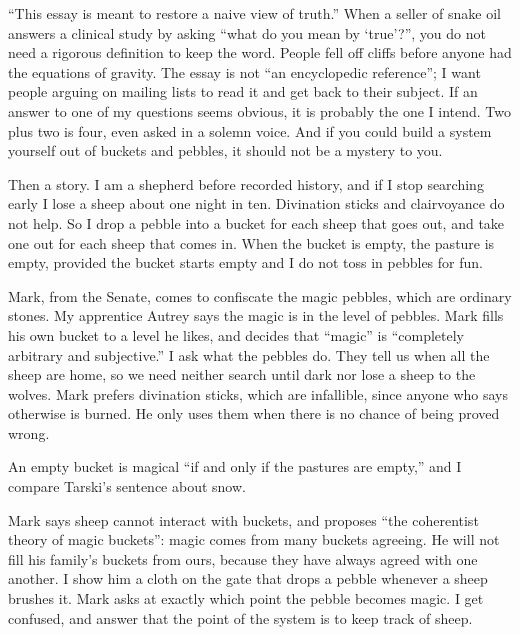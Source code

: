 
``This essay is meant to restore a naive view of truth.'' When a seller of snake oil answers a clinical study by asking ``what do you mean by `true'?'', you do not need a rigorous definition to keep the word. People fell off cliffs before anyone had the equations of gravity. The essay is not ``an encyclopedic reference''; I want people arguing on mailing lists to read it and get back to their subject. If an answer to one of my questions seems obvious, it is probably the one I intend. Two plus two is four, even asked in a solemn voice. And if you could build a system yourself out of buckets and pebbles, it should not be a mystery to you.

Then a story. I am a shepherd before recorded history, and if I stop searching early I lose a sheep about one night in ten. Divination sticks and clairvoyance do not help. So I drop a pebble into a bucket for each sheep that goes out, and take one out for each sheep that comes in. When the bucket is empty, the pasture is empty, provided the bucket starts empty and I do not toss in pebbles for fun.

Mark, from the Senate, comes to confiscate the magic pebbles, which are ordinary stones. My apprentice Autrey says the magic is in the level of pebbles. Mark fills his own bucket to a level he likes, and decides that ``magic'' is ``completely arbitrary and subjective.'' I ask what the pebbles do. They tell us when all the sheep are home, so we need neither search until dark nor lose a sheep to the wolves. Mark prefers divination sticks, which are infallible, since anyone who says otherwise is burned. He only uses them when there is no chance of being proved wrong.

An empty bucket is magical ``if and only if the pastures are empty,'' and I compare Tarski's sentence about snow. 

Mark says sheep cannot interact with buckets, and proposes ``the coherentist theory of magic buckets'': magic comes from many buckets agreeing. He will not fill his family's buckets from ours, because they have always agreed with one another.  I show him a cloth on the gate that drops a pebble whenever a sheep brushes it. Mark asks at exactly which point the pebble becomes magic. I get confused, and answer that the point of the system is to keep track of sheep.

